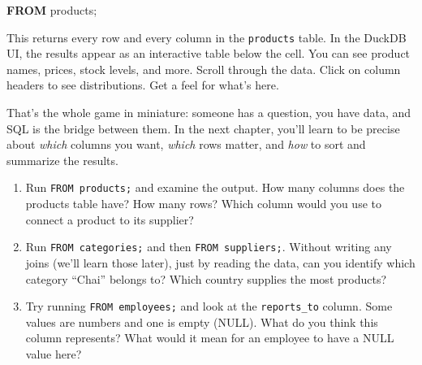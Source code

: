 \documentclass[
  letterpaper,
  DIV=11,
  numbers=noendperiod]{scrreprt}
\newenvironment{Shaded}{\begin{snugshade}}{\end{snugshade}}
\newcommand{\KeywordTok}[1]{\textcolor[rgb]{0.00,0.23,0.31}{\textbf{#1}}}
\newcommand{\NormalTok}[1]{\textcolor[rgb]{0.00,0.23,0.31}{#1}}
\begin{document}
\begin{codelisting}

\caption{\texttt{duckdb}}

\begin{Shaded}
\begin{Highlighting}[]
\KeywordTok{FROM}\NormalTok{ products;}
\end{Highlighting}
\end{Shaded}

\end{codelisting}

This returns every row and every column in the \texttt{products} table.
In the DuckDB UI, the results appear as an interactive table below the
cell. You can see product names, prices, stock levels, and more. Scroll
through the data. Click on column headers to see distributions. Get a
feel for what's here.

That's the whole game in miniature: someone has a question, you have
data, and SQL is the bridge between them. In the next chapter, you'll
learn to be precise about \emph{which} columns you want, \emph{which}
rows matter, and \emph{how} to sort and summarize the results.

\begin{tcolorbox}[enhanced jigsaw, opacitybacktitle=0.6, arc=.35mm, colback=white, bottomtitle=1mm, opacityback=0, toprule=.15mm, left=2mm, colbacktitle=quarto-callout-note-color!10!white, breakable, coltitle=black, toptitle=1mm, colframe=quarto-callout-note-color-frame, bottomrule=.15mm, titlerule=0mm, title=\textcolor{quarto-callout-note-color}{\faInfo}\hspace{0.5em}{Exercises}, rightrule=.15mm, leftrule=.75mm]

\begin{enumerate}
\def\labelenumi{\arabic{enumi}.}
\item
  Run \texttt{FROM\ products;} and examine the output. How many columns
  does the products table have? How many rows? Which column would you
  use to connect a product to its supplier?
\item
  Run \texttt{FROM\ categories;} and then \texttt{FROM\ suppliers;}.
  Without writing any joins (we'll learn those later), just by reading
  the data, can you identify which category ``Chai'' belongs to? Which
  country supplies the most products?
\item
  Try running \texttt{FROM\ employees;} and look at the
  \texttt{reports\_to} column. Some values are numbers and one is empty
  (NULL). What do you think this column represents? What would it mean
  for an employee to have a NULL value here?
\end{enumerate}

\end{tcolorbox}
\end{document}
